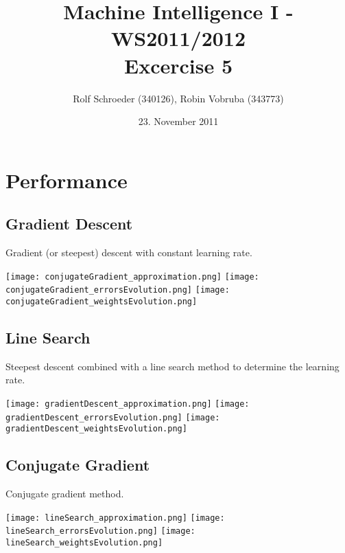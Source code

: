 \documentclass[a4paper,headings=small]{scrartcl}
\title{Machine Intelligence I - WS2011/2012\\Excercise 5}
\author{Rolf Schroeder (340126), Robin Vobruba (343773)}
\date{23. November 2011}
\numberwithin{equation}{section} %
\numberwithin{figure}{section}   %
\begin{document}
\maketitle

\section{Performance}



\subsection{Gradient Descent}

Gradient (or steepest) descent with constant learning rate.

\texttt{[image: conjugateGradient\_approximation.png]}%
\texttt{[image: conjugateGradient\_errorsEvolution.png]}%
\texttt{[image: conjugateGradient\_weightsEvolution.png]}


\subsection{Line Search}

Steepest descent combined with a line search method to determine the learning rate.

\texttt{[image: gradientDescent\_approximation.png]}%
\texttt{[image: gradientDescent\_errorsEvolution.png]}%
\texttt{[image: gradientDescent\_weightsEvolution.png]}


\subsection{Conjugate Gradient}

Conjugate gradient method.

\texttt{[image: lineSearch\_approximation.png]}%
\texttt{[image: lineSearch\_errorsEvolution.png]}%
\texttt{[image: lineSearch\_weightsEvolution.png]}
\end{document}
